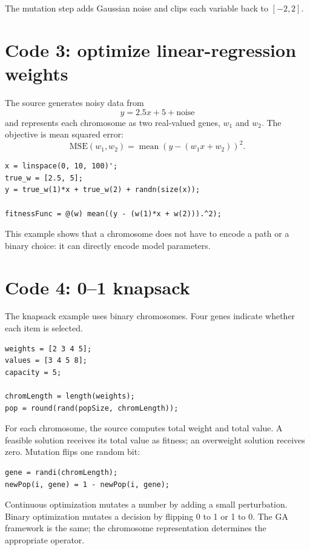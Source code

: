 The mutation step adds Gaussian noise and clips each variable back to \([-2,2]\).

\section{Code 3: optimize linear-regression weights}

The source generates noisy data from
\[
y=2.5x+5+\text{noise}
\]
and represents each chromosome as two real-valued genes, \(w_1\) and \(w_2\). The objective is mean squared error:
\[
\mathrm{MSE}(w_1,w_2)=\operatorname{mean}
\left(y-(w_1x+w_2)\right)^2.
\]

\begin{lstlisting}[style=mlmatlab]
x = linspace(0, 10, 100)';
true_w = [2.5, 5];
y = true_w(1)*x + true_w(2) + randn(size(x));

fitnessFunc = @(w) mean((y - (w(1)*x + w(2))).^2);
\end{lstlisting}

This example shows that a chromosome does not have to encode a path or a binary choice: it can directly encode model parameters.

\section{Code 4: 0--1 knapsack}

The knapsack example uses binary chromosomes. Four genes indicate whether each item is selected.

\begin{lstlisting}[style=mlmatlab]
weights = [2 3 4 5];
values = [3 4 5 8];
capacity = 5;

chromLength = length(weights);
pop = round(rand(popSize, chromLength));
\end{lstlisting}

For each chromosome, the source computes total weight and total value. A feasible solution receives its total value as fitness; an overweight solution receives zero. Mutation flips one random bit:

\begin{lstlisting}[style=mlmatlab]
gene = randi(chromLength);
newPop(i, gene) = 1 - newPop(i, gene);
\end{lstlisting}

\begin{intuition}
Continuous optimization mutates a number by adding a small perturbation. Binary optimization mutates a decision by flipping 0 to 1 or 1 to 0. The GA framework is the same; the chromosome representation determines the appropriate operator.
\end{intuition}

